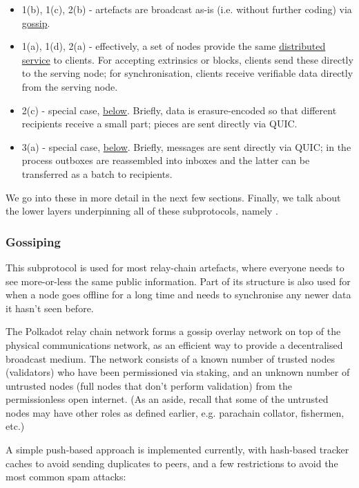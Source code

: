 \documentclass{article}
\begin{document}
\begin{itemize}
	\item 1(b), 1(c), 2(b) - artefacts are broadcast as-is (i.e. without further coding) via \hyperref[sec:gossiping]{gossip}.
	\item 1(a), 1(d), 2(a) - effectively, a set of nodes provide the same \hyperref[sec:net_service]{distributed service} to clients. For accepting extrinsics or blocks, clients send these directly to the serving node; for synchronisation, clients receive verifiable data directly from the serving node.
	\item 2(c) - special case, \hyperref[sec:net_storage]{below}. Briefly, data is erasure-encoded so that different recipients receive a small part; pieces are sent directly via QUIC.
	\item 3(a) - special case, \hyperref[sec:net_crosschain]{below}. Briefly, messages are sent directly via QUIC; in the process outboxes are reassembled into inboxes and the latter can be transferred as a batch to recipients.
\end{itemize}

We go into these in more detail in the next few sections. Finally, we talk about the lower layers underpinning all of these subprotocols, namely .

\subsubsection{Gossiping} \label{sec:gossiping}

This subprotocol is used for most relay-chain artefacts, where everyone needs to see more-or-less the same public information. Part of its structure is also used for when a node goes offline for a long time and needs to synchronise any newer data it hasn't seen before.

The Polkadot relay chain network forms a gossip overlay network on top of the physical communications network, as an efficient way to provide a decentralised broadcast medium. The network consists of a known number of trusted nodes (validators) who have been permissioned via staking, and an unknown number of untrusted nodes (full nodes that don't perform validation) from the permissionless open internet. (As an aside, recall that some of the untrusted nodes may have other roles as defined earlier, e.g. parachain collator, fishermen, etc.)

A simple push-based approach is implemented currently, with hash-based tracker caches to avoid sending duplicates to peers, and a few restrictions to avoid the most common spam attacks:
\end{document}

